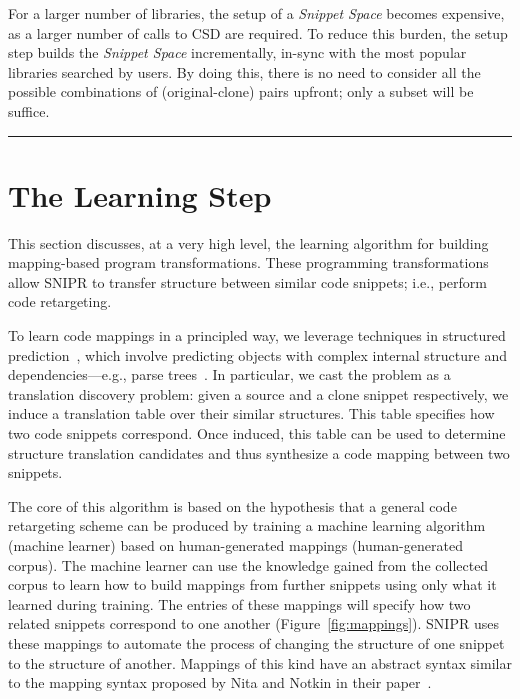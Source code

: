 For a larger number of libraries, the setup of a \emph{Snippet Space} becomes expensive, as a larger number of calls to CSD are required. To reduce this burden, the setup step builds the \emph{Snippet Space} incrementally, in-sync with the most popular libraries searched by users. By doing this, there is no need to consider all the possible combinations of (original-clone) pairs upfront; only a subset will be suffice.

\fancybreak{\pfbreakdisplay}

\section{The Learning Step}
\label{sec:learning}

This section discusses, at a very high level, the learning algorithm for building mapping-based program transformations. These programming transformations allow \uppercase{SnipR} to transfer structure between similar code snippets; i.e., perform code retargeting. 

To learn code mappings in a principled way, we leverage techniques in structured prediction~\cite{Collins:2002uo}, which involve predicting objects with complex internal structure and dependencies---e.g., parse trees~\cite{Kumar:2011uj}. In particular, we cast the problem as a translation discovery problem: given a source and a clone snippet respectively, we induce a translation table over their similar structures. This table specifies how two code snippets correspond. Once induced, this table can be used to determine structure translation candidates and thus synthesize a code mapping between two snippets. 

The core of this algorithm is based on the hypothesis that a general code retargeting scheme can be produced by training a machine learning algorithm (machine learner) based on human-generated mappings (human-generated corpus). The machine learner can use the knowledge gained from the collected corpus to learn how to build mappings from further snippets using only what it learned during training. The entries of these mappings will specify how two related snippets correspond to one another (Figure~\ref{fig:mappings}). SNIPR uses these mappings to automate the process of changing the structure of one snippet to the structure of another. Mappings of this kind have an abstract syntax similar to the mapping syntax proposed by Nita and Notkin in their paper~\cite{Nita:2010en}.

